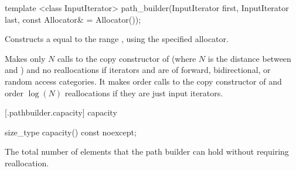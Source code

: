 %
\begin{itemdecl}
template <class InputIterator>
path_builder(InputIterator first, InputIterator last,
  const Allocator& = Allocator());
\end{itemdecl}
\begin{itemdescr}
\pnum
\effects
Constructs a  equal to the range , using the specified allocator.

\pnum
\complexity
Makes only $N$ calls to the copy constructor of  (where $N$
is the distance between
and
)
and no reallocations if iterators  and  are of forward, bidirectional, or random access categories.
It makes order
calls to the copy constructor of
and order
$\log(N)$
reallocations if they are just input iterators.

\end{itemdescr}

 [\iotwod.pathbuilder.capacity] { capacity}%

%
\begin{itemdecl}
size_type capacity() const noexcept;
\end{itemdecl}
\begin{itemdescr}
\pnum
\returns
The total number of elements that the path builder can hold without requiring reallocation.
\end{itemdescr}

